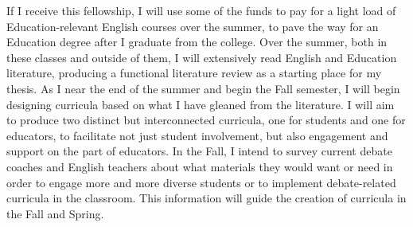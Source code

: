 \documentclass[man,12pt,natbib]{apa6}
\begin{document}
If I receive this fellowship, I will use some of the funds to pay for a light
load of Education-relevant English courses over the summer, to pave the way for an Education degree after I graduate from the college. Over the summer, both 
in these classes and outside of them, I will extensively read English and
Education literature, producing a functional literature review as a starting
place for my thesis. As I near the end of the summer and begin the Fall
semester, I will begin designing curricula based on what I have gleaned from
the literature. I will aim to produce two distinct but interconnected
curricula, one for students and one for educators, to facilitate not just
student involvement, but also engagement and support on the part of educators.
In the Fall, I intend to survey current debate coaches and English teachers
about what materials they would want or need in order to engage more and more
diverse students or to implement debate-related curricula in the classroom.
This information will guide the creation of curricula in the Fall and Spring.

\clearpage

\end{document}
